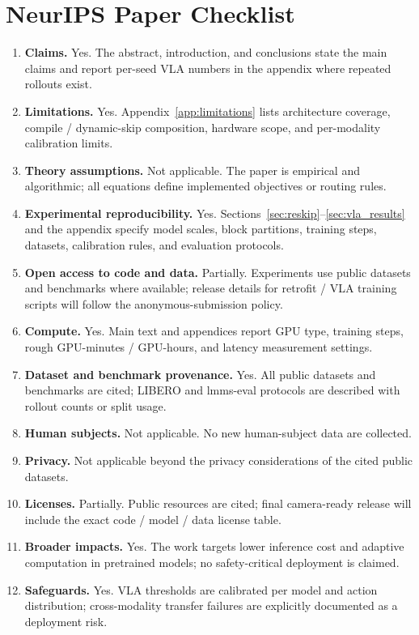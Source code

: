 \documentclass{article}
\begin{document}
\section{NeurIPS Paper Checklist}
\label{app:checklist}
\begin{enumerate}
\item \textbf{Claims.} Yes. The abstract, introduction, and conclusions state the main claims and report per-seed VLA numbers in the appendix where repeated rollouts exist.
\item \textbf{Limitations.} Yes. Appendix~\ref{app:limitations} lists architecture coverage, compile / dynamic-skip composition, hardware scope, and per-modality calibration limits.
\item \textbf{Theory assumptions.} Not applicable. The paper is empirical and algorithmic; all equations define implemented objectives or routing rules.
\item \textbf{Experimental reproducibility.} Yes. Sections~\ref{sec:reskip}--\ref{sec:vla_results} and the appendix specify model scales, block partitions, training steps, datasets, calibration rules, and evaluation protocols.
\item \textbf{Open access to code and data.} Partially. Experiments use public datasets and benchmarks where available; release details for retrofit / VLA training scripts will follow the anonymous-submission policy.
\item \textbf{Compute.} Yes. Main text and appendices report GPU type, training steps, rough GPU-minutes / GPU-hours, and latency measurement settings.
\item \textbf{Dataset and benchmark provenance.} Yes. All public datasets and benchmarks are cited; LIBERO and lmms-eval protocols are described with rollout counts or split usage.
\item \textbf{Human subjects.} Not applicable. No new human-subject data are collected.
\item \textbf{Privacy.} Not applicable beyond the privacy considerations of the cited public datasets.
\item \textbf{Licenses.} Partially. Public resources are cited; final camera-ready release will include the exact code / model / data license table.
\item \textbf{Broader impacts.} Yes. The work targets lower inference cost and adaptive computation in pretrained models; no safety-critical deployment is claimed.
\item \textbf{Safeguards.} Yes. VLA thresholds are calibrated per model and action distribution; cross-modality transfer failures are explicitly documented as a deployment risk.
\end{enumerate}
\end{document}

